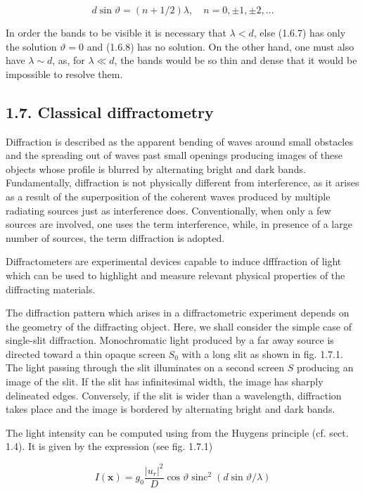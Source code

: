 \documentclass{article}
\begin{document}
\begin{equation*}
d \sin \vartheta=(n+1 / 2) \lambda, \quad n=0, \pm 1, \pm 2, \ldots \tag{1.6.8}
\end{equation*}
 

In order the bands to be visible it is necessary that $\lambda<d$, else (1.6.7) has only the solution $\vartheta=0$ and (1.6.8) has no solution. On the other hand, one must also have $\lambda \sim d$, as, for $\lambda \ll d$, the bands would be so thin and dense that it would be impossible to resolve them.

\subsection*{1.7. Classical diffractometry}

Diffraction is described as the apparent bending of waves around small obstacles and the spreading out of waves past small openings producing images of these objects whose profile is blurred by alternating bright and dark bands. Fundamentally, diffraction is not physically different from interference, as it arises as a result of the superposition of the coherent waves produced by multiple radiating sources just as interference does. Conventionally, when only a few sources are involved, one uses the term interference, while, in presence of a large number of sources, the term diffraction is adopted.

Diffractometers are experimental devices capable to induce dfffraction of light which can be used to highlight and measure relevant physical properties of the diffracting materials.

The diffraction pattern which arises in a diffractometric experiment depends on the geometry of the diffracting object. Here, we shall consider the simple case of single-slit diffraction. Monochromatic light produced by a far away source is directed toward a thin opaque screen $S_{0}$ with a long slit as shown in fig. 1.7.1. The light passing through the slit illuminates on a second screen $S$ producing an image of the slit. If the slit has infinitesimal width, the image has sharply delineated edges. Conversely, if the slit is wider than a wavelength, diffraction takes place and the image is bordered by alternating bright and dark bands.

The light intensity can be computed using from the Huygens principle (cf. sect. 1.4). It is given by the expression (see fig. 1.7.1)
 
\begin{equation*}
I(\boldsymbol{x})=g_{0} \frac{\left|u_{r}\right|^{2}}{D} \cos \vartheta \operatorname{sinc}^{2}(d \sin \vartheta / \lambda) \tag{1.7.1}
\end{equation*}
 
\end{document}
